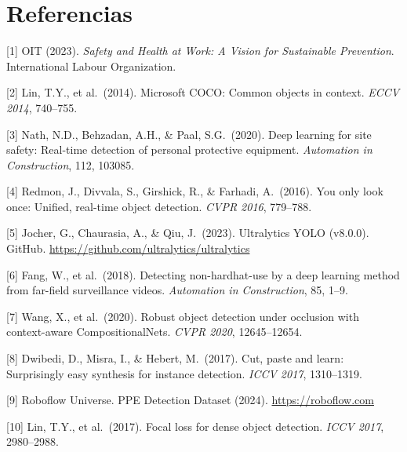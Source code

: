 \documentclass{article}
\begin{document}
\section*{Referencias}
{\small

[1] OIT (2023). \textit{Safety and Health at Work: A Vision for
Sustainable Prevention}. International Labour Organization.

[2] Lin, T.Y., et al.\ (2014). Microsoft COCO: Common objects in context.
\textit{ECCV 2014}, 740--755.

[3] Nath, N.D., Behzadan, A.H., \& Paal, S.G.\ (2020).
Deep learning for site safety: Real-time detection of personal
protective equipment. \textit{Automation in Construction},
112, 103085.

[4] Redmon, J., Divvala, S., Girshick, R., \& Farhadi, A.\ (2016).
You only look once: Unified, real-time object detection.
\textit{CVPR 2016}, 779--788.

[5] Jocher, G., Chaurasia, A., \& Qiu, J.\ (2023).
Ultralytics YOLO (v8.0.0). GitHub.
\url{https://github.com/ultralytics/ultralytics}

[6] Fang, W., et al.\ (2018). Detecting non-hardhat-use by a
deep learning method from far-field surveillance videos.
\textit{Automation in Construction}, 85, 1--9.

[7] Wang, X., et al.\ (2020). Robust object detection under
occlusion with context-aware CompositionalNets.
\textit{CVPR 2020}, 12645--12654.

[8] Dwibedi, D., Misra, I., \& Hebert, M.\ (2017).
Cut, paste and learn: Surprisingly easy synthesis for instance
detection. \textit{ICCV 2017}, 1310--1319.

[9] Roboflow Universe. PPE Detection Dataset (2024).
\url{https://roboflow.com}

[10] Lin, T.Y., et al.\ (2017). Focal loss for dense object detection.
\textit{ICCV 2017}, 2980--2988.

}
\end{document}
